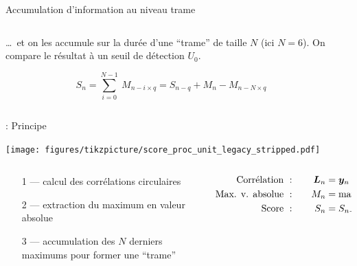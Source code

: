 \documentclass[../main.tex]{subfiles}
\begin{document}
\begin{frame}{Accumulation d'information au niveau trame}
  \begin{columns}
    \begin{column}{.5\linewidth}
      \begin{overlayarea}{\linewidth}{.875\textheight}
        \dots~et on les accumule sur la durée d'une ``trame'' de taille $N$ (ici $N = 6$). On compare le résultat à un seuil de détection $U_0$. \vspace{-1.75em}

        $$S_n = \sum_{i = 0}^{N - 1}\:M_{n - i \times q} = S_{n - q} + M_{n} - M_{n - N \times q}$$ \vspace{-2em}
        \begin{center}
          \resizebox{.6\linewidth}{!}{
            
          }
        \end{center}
      \end{overlayarea}
    \end{column}
    \begin{column}{.5\linewidth}
      \centering
      \resizebox{\linewidth}{!}{
        
      }
    \end{column}
  \end{columns}
\end{frame}

\begin{frame}{\subsecname : {Principe}}
  \begin{center}
    \texttt{[image: figures/tikzpicture/score\_proc\_unit\_legacy\_stripped.pdf]}
  \end{center}
  \begin{columns}
    \begin{column}{.5\linewidth}
      \centering
      \begin{itemize}
        \item [1 ---] calcul des corrélations circulaires
        \item [2 ---] extraction du maximum en valeur absolue
        \item [3 ---] accumulation des $N$ derniers maximums pour former une ``trame''
      \end{itemize}
    \end{column}
    \begin{column}{.5\linewidth}
      \centering
      \begin{align*}
        \text{Corrélation }     & :\quad & \bm{L}_n & = \bm{y}_n \star \bm{P}_{0}               \\
        \text{Max. v. absolue } & :\quad & M_n        & = \mathrm{max}(|\bm{L}_n|)             \\
        \text{Score }           & :\quad & S_n        & = S_{n - q} + M_{n} - M_{n - N \times q}
      \end{align*}
    \end{column}
  \end{columns}
\end{frame}
\end{document}
